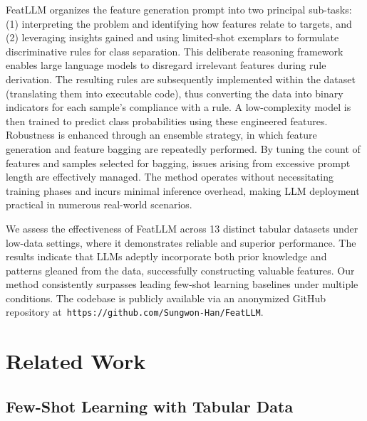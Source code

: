 \textsf{FeatLLM} organizes the feature generation prompt into two principal sub-tasks: (1) interpreting the problem and identifying how features relate to targets, and (2) leveraging insights gained and using limited-shot exemplars to formulate discriminative rules for class separation. This deliberate reasoning framework enables large language models to disregard irrelevant features during rule derivation. The resulting rules are subsequently implemented within the dataset (translating them into executable code), thus converting the data into binary indicators for each sample’s compliance with a rule. A low-complexity model is then trained to predict class probabilities using these engineered features. Robustness is enhanced through an ensemble strategy, in which feature generation and feature bagging are repeatedly performed. By tuning the count of features and samples selected for bagging, issues arising from excessive prompt length are effectively managed. The method operates without necessitating training phases and incurs minimal inference overhead, making LLM deployment practical in numerous real-world scenarios.

We assess the effectiveness of \textsf{FeatLLM} across 13 distinct tabular datasets under low-data settings, where it demonstrates reliable and superior performance. The results indicate that LLMs adeptly incorporate both prior knowledge and patterns gleaned from the data, successfully constructing valuable features. Our method consistently surpasses leading few-shot learning baselines under multiple conditions. The codebase is publicly available via an anonymized GitHub repository at~\texttt{https://github.com/Sungwon-Han/FeatLLM}.

\section{Related Work}

\subsection{Few-Shot Learning with Tabular Data}

